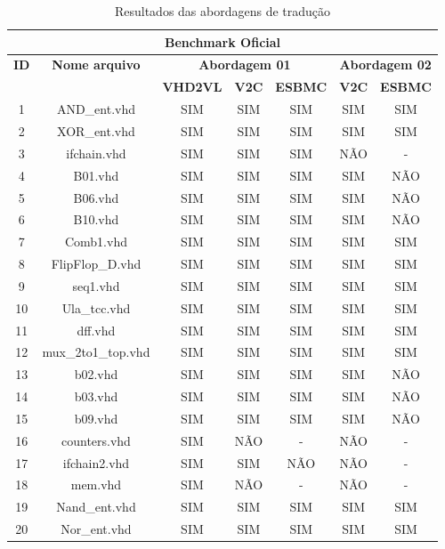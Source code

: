 \begin{table}[H]
\centering
\caption{Resultados das abordagens de tradução}
\label{tab:tabela_resultado}
\begin{tabular}{|c|c|c|c|c|c|c|}
\hline
\multicolumn{7}{|c|}{\textbf{Benchmark Oficial}} \\ \hline
\multirow{2}{*}{\textbf{ID}} & \multirow{2}{*}{\textbf{Nome arquivo}} & \multicolumn{3}{c|}{\textbf{Abordagem 01}} & \multicolumn{2}{c|}{\textbf{Abordagem 02}} \\ \cline{3-7} 
 &  & \textbf{VHD2VL} & \textbf{V2C} & \multicolumn{1}{l|}{\textbf{ESBMC}} & \textbf{V2C} & \multicolumn{1}{l|}{\textbf{ESBMC}} \\ \hline
1 & AND\_ent.vhd & SIM & SIM & SIM & SIM & SIM \\ \hline
2 & XOR\_ent.vhd & SIM & SIM & SIM & SIM & SIM \\ \hline
3 & ifchain.vhd & SIM & SIM & SIM & NÃO & - \\ \hline
4 & B01.vhd & SIM & SIM & SIM & SIM & NÃO \\ \hline
5 & B06.vhd & SIM & SIM & SIM & SIM & NÃO \\ \hline
6 & B10.vhd & SIM & SIM & SIM & SIM & NÃO \\ \hline
7 & Comb1.vhd & SIM & SIM & SIM & SIM & SIM \\ \hline
8 & FlipFlop\_D.vhd & SIM & SIM & SIM & SIM & SIM \\ \hline
9 & seq1.vhd & SIM & SIM & SIM & SIM & SIM \\ \hline
10 & Ula\_tcc.vhd & SIM & SIM & SIM & SIM & SIM \\ \hline
11 & dff.vhd & SIM & SIM & SIM & SIM & SIM \\ \hline
12 & mux\_2to1\_top.vhd & SIM & SIM & SIM & SIM & SIM \\ \hline
13 & b02.vhd & SIM & SIM & SIM & SIM & NÃO \\ \hline
14 & b03.vhd & SIM & SIM & SIM & SIM & NÃO \\ \hline
15 & b09.vhd & SIM & SIM & SIM & SIM & NÃO \\ \hline
16 & counters.vhd & SIM & NÃO & - & NÃO & - \\ \hline
17 & ifchain2.vhd & SIM & SIM & NÃO & NÃO & - \\ \hline
18 & mem.vhd & SIM & NÃO & - & NÃO & - \\ \hline
19 & Nand\_ent.vhd & SIM & SIM & SIM & SIM & SIM \\ \hline
20 & Nor\_ent.vhd & SIM & SIM & SIM & SIM & SIM \\ \hline
\end{tabular}
\end{table}

